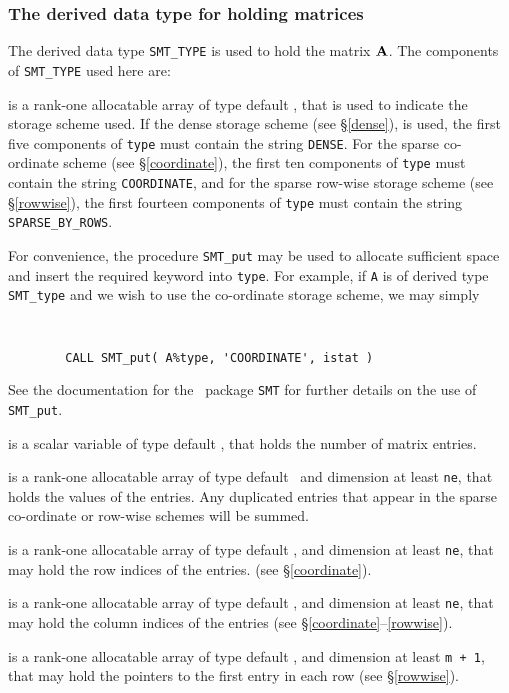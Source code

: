 \documentclass{galahad}
\begin{document}

\subsubsection{The derived data type for holding matrices}\label{typesmt}
The derived data type {\tt SMT\_TYPE} is used to hold the matrix ${\mathbf{A}}$.
The components of {\tt SMT\_TYPE} used here are:

\begin{description}



 is a rank-one allocatable array of type default \character, that
is used to indicate the storage scheme used. If the dense storage scheme
(see \S\ref{dense}), is used,
the first five components of {\tt type} must contain the
string {\tt DENSE}.
For the sparse co-ordinate scheme (see \S\ref{coordinate}),
the first ten components of {\tt type} must contain the
string {\tt COORDINATE},  and
for the sparse row-wise storage scheme (see \S\ref{rowwise}),
the first fourteen components of {\tt type} must contain the
string {\tt SPARSE\_BY\_ROWS}.

For convenience, the procedure {\tt SMT\_put}
may be used to allocate sufficient space and insert the required keyword
into {\tt type}.
For example, if {\tt A} is of derived type {\tt SMT\_type}
and we wish to use the co-ordinate storage scheme, we may simply
{\tt
\begin{verbatim}
        CALL SMT_put( A%type, 'COORDINATE', istat )
\end{verbatim}
}
\noindent
See the documentation for the \galahad\ package {\tt SMT}
for further details on the use of {\tt SMT\_put}.

 is a scalar variable of type default \integer, that
holds the number of matrix entries.

 is a rank-one allocatable array of type default \realdp\,
and dimension at least {\tt ne}, that holds the values of the entries.
Any duplicated entries that appear in the sparse
co-ordinate or row-wise schemes will be summed.

 is a rank-one allocatable array of type default \integer,
and dimension at least {\tt ne}, that may hold the row indices of the entries.
(see \S\ref{coordinate}).

 is a rank-one allocatable array of type default \integer,
and dimension at least {\tt ne}, that may hold the column indices of the entries
(see \S\ref{coordinate}--\ref{rowwise}).

 is a rank-one allocatable array of type default \integer,
and dimension at least {\tt m + 1}, that may hold the pointers to
the first entry in each row (see \S\ref{rowwise}).

\end{description}
\end{document}
